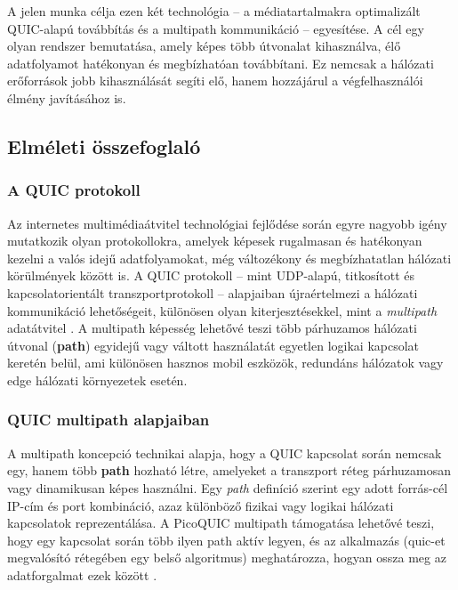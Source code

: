 \documentclass[a4paper,oneside]{article}
\begin{document}
A jelen munka célja ezen két technológia – a médiatartalmakra optimalizált QUIC-alapú 
továbbítás és a multipath kommunikáció – egyesítése. A cél egy olyan rendszer bemutatása, 
amely képes több útvonalat kihasználva, élő adatfolyamot hatékonyan és megbízhatóan 
továbbítani. Ez nemcsak a hálózati erőforrások jobb kihasználását segíti elő, hanem 
hozzájárul a végfelhasználói élmény javításához is.



\subsection{Elméleti összefoglaló}

\subsubsection{A QUIC protokoll}

Az internetes multimédiaátvitel technológiai fejlődése során egyre 
nagyobb igény mutatkozik olyan protokollokra, amelyek képesek 
rugalmasan és hatékonyan kezelni a valós idejű adatfolyamokat, még 
változékony és megbízhatatlan hálózati körülmények között is. \cite{quic} A QUIC 
protokoll – mint UDP-alapú, titkosított és kapcsolatorientált 
transzportprotokoll – alapjaiban újraértelmezi a hálózati kommunikáció 
lehetőségeit, különösen olyan kiterjesztésekkel, mint a \emph{multipath} 
adatátvitel \cite{mp_quic}. A multipath képesség lehetővé teszi több párhuzamos hálózati 
útvonal (\textbf{path}) egyidejű vagy váltott használatát egyetlen logikai kapcsolat keretén 
belül, ami különösen hasznos mobil eszközök, redundáns hálózatok vagy edge 
hálózati környezetek esetén.


\subsubsection{QUIC multipath alapjaiban}

A multipath koncepció technikai alapja, hogy a QUIC kapcsolat során nemcsak egy, 
hanem több \textbf{path}
hozható létre, amelyeket a transzport réteg párhuzamosan vagy dinamikusan képes használni. 
Egy \emph{path} definíció szerint egy adott forrás-cél IP-cím és port kombináció, azaz 
különböző fizikai vagy logikai hálózati kapcsolatok reprezentálása. A PicoQUIC multipath 
támogatása lehetővé teszi, hogy egy kapcsolat során több ilyen path aktív legyen, és az 
alkalmazás (quic-et megvalósító rétegében egy belső algoritmus) meghatározza, 
hogyan ossza meg az adatforgalmat ezek között \cite{pico_git}.
\end{document}
